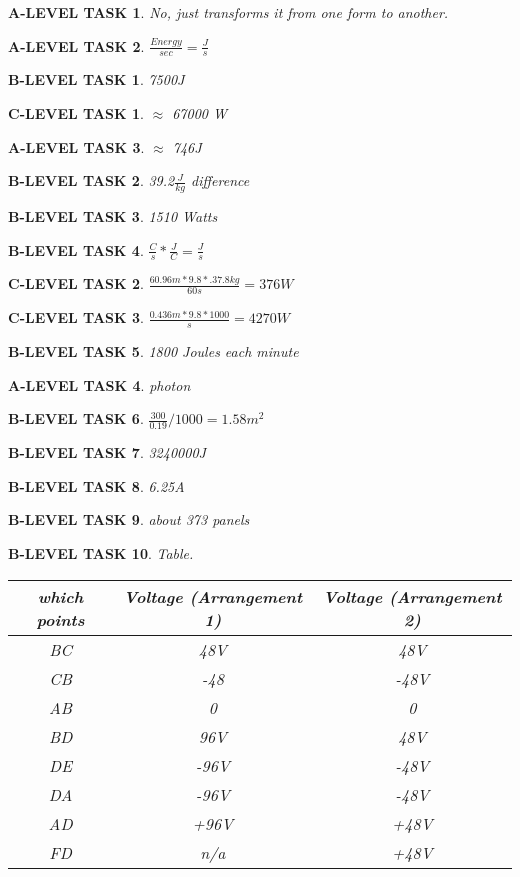 \documentclass{book}
\numberwithin{equation}{section}
\newtheorem{alevel}{A-LEVEL TASK}
\newtheorem{blevel}{B-LEVEL TASK}
\newtheorem{clevel}{C-LEVEL TASK}
\theoremstyle{definition}
\begin{document}
\begin{alevel}No, just transforms it from one form to another.\end{alevel}
\begin{alevel}$\frac{Energy}{sec}=\frac{J}{s}$\end{alevel}
\begin{blevel}7500J\end{blevel}
\begin{clevel}$\approx$ 67000 W\end{clevel}
\begin{alevel}$\approx$ 746J\end{alevel}

\begin{blevel}39.2$\frac{J}{kg}$ difference\end{blevel}
\begin{blevel}1510 Watts\end{blevel}
\begin{blevel}$\frac{C}{s}*\frac{J}{C}=\frac{J}{s}$\end{blevel}
\begin{clevel}$\frac{60.96m*9.8*.37.8kg}{60s}=376W$\end{clevel}
\begin{clevel}$\frac{0.436m*9.8*1000}{s}=4270W$\end{clevel}
\begin{blevel}1800 Joules each minute\end{blevel}
\begin{alevel}photon\end{alevel}
\begin{blevel}$\frac{300}{0.19}/1000=1.58m^2$\end{blevel}
\begin{blevel}3240000J\end{blevel}
\begin{blevel}6.25A\end{blevel}
\begin{blevel}about 373 panels\end{blevel}

\begin{blevel}Table.\par
\begin{table}[H]
\begin{center}
\begin{tabular}{|c|c|c|}\hline
which points	& Voltage (Arrangement 1)&Voltage (Arrangement 2) \\ \hline
BC & 48V& 48V\\ \hline
CB & -48& -48V\\ \hline
AB & 0& 0\\ \hline
BD & 96V& 48V\\ \hline
DE & -96V& -48V\\ \hline
DA & -96V& -48V\\ \hline
AD & +96V& +48V\\ \hline
FD & n/a &+48V \\ \hline	
\end{tabular}
\end{center}
\end{table}
\end{blevel}
\end{document}
